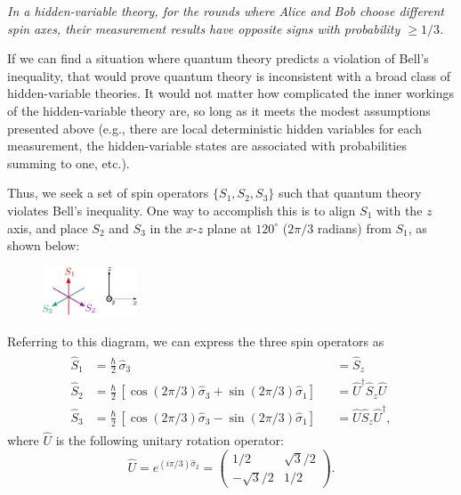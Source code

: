 \documentclass[prx,12pt]{revtex4-2}
\begin{document}
\begin{framed}
\noindent
\textit{In a hidden-variable theory, for the rounds where Alice and
  Bob choose different spin axes, their measurement results have
  opposite signs with probability $\ge 1/3$.}
\end{framed}

If we can find a situation where quantum theory predicts a violation
of Bell's inequality, that would prove quantum theory is inconsistent
with a broad class of hidden-variable theories.  It would not matter
how complicated the inner workings of the hidden-variable theory are,
so long as it meets the modest assumptions presented above (e.g.,
there are local deterministic hidden variables for each measurement,
the hidden-variable states are associated with probabilities summing
to one, etc.).

Thus, we seek a set of spin operators $\{S_1, S_2, S_3\}$ such that
quantum theory violates Bell's inequality.  One way to accomplish this
is to align $S_1$ with the $z$ axis, and place $S_2$ and $S_3$ in the
$x$-$z$ plane at $120^\circ$ ($2\pi/3$ radians) from $S_1$, as shown
below:

\begin{figure}[h]
  \centering\includegraphics[width=0.25\textwidth]{bellaxes}
\end{figure}

\noindent
Referring to this diagram, we can express the three spin operators as
\begin{align}
  \begin{aligned}
    \hat{S}_1 &= \frac{\hbar}{2} \, \hat{\sigma}_3
    && = \hat{S}_z
    \\
    \hat{S}_2 &= \frac{\hbar}{2} \, \left[\cos(2\pi/3) \hat{\sigma}_3 + \sin(2\pi/3)\hat{\sigma}_1\right] &&= \hat{U}^\dagger \hat{S}_z \hat{U}
    \\
    \hat{S}_3 &= \frac{\hbar}{2} \, \left[\cos(2\pi/3) \hat{\sigma}_3 - \sin(2\pi/3)\hat{\sigma}_1\right] &&= \hat{U} \hat{S}_z \hat{U}^\dagger,
  \end{aligned}
\end{align}
where $\hat{U}$ is the following unitary rotation operator:
\begin{equation}
  \hat{U} = e^{(i\pi/3) \hat{\sigma}_2}
  = \begin{pmatrix} 1/2 & \sqrt{3}/2\\
    -\sqrt{3}/2 & 1/2
  \end{pmatrix}.
  \label{Uform}
\end{equation}
\end{document}
